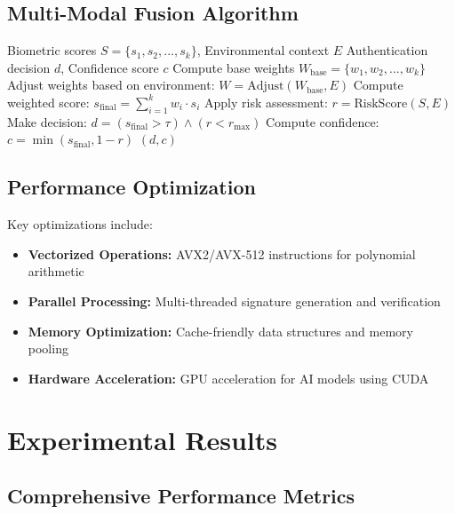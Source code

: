 \documentclass[12pt,a4paper]{article}
\begin{document}
\subsection{Multi-Modal Fusion Algorithm}

\begin{algorithm}[H]
\caption{Adaptive Multi-Modal Fusion}
\label{alg:fusion}
\begin{algorithmic}[1]
\REQUIRE Biometric scores $S = \{s_1, s_2, ..., s_k\}$, Environmental context $E$
\ENSURE Authentication decision $d$, Confidence score $c$
\STATE Compute base weights $W_{\text{base}} = \{w_1, w_2, ..., w_k\}$
\STATE Adjust weights based on environment: $W = \text{Adjust}(W_{\text{base}}, E)$
\STATE Compute weighted score: $s_{\text{final}} = \sum_{i=1}^{k} w_i \cdot s_i$
\STATE Apply risk assessment: $r = \text{RiskScore}(S, E)$
\STATE Make decision: $d = (s_{\text{final}} > \tau) \land (r < r_{\text{max}})$
\STATE Compute confidence: $c = \min(s_{\text{final}}, 1-r)$
\RETURN $(d, c)$
\end{algorithmic}
\end{algorithm}

\subsection{Performance Optimization}

Key optimizations include:

\begin{itemize}
    \item \textbf{Vectorized Operations:} AVX2/AVX-512 instructions for polynomial arithmetic
    \item \textbf{Parallel Processing:} Multi-threaded signature generation and verification
    \item \textbf{Memory Optimization:} Cache-friendly data structures and memory pooling
    \item \textbf{Hardware Acceleration:} GPU acceleration for AI models using CUDA
\end{itemize}

\section{Experimental Results}

\subsection{Comprehensive Performance Metrics}
\end{document}
